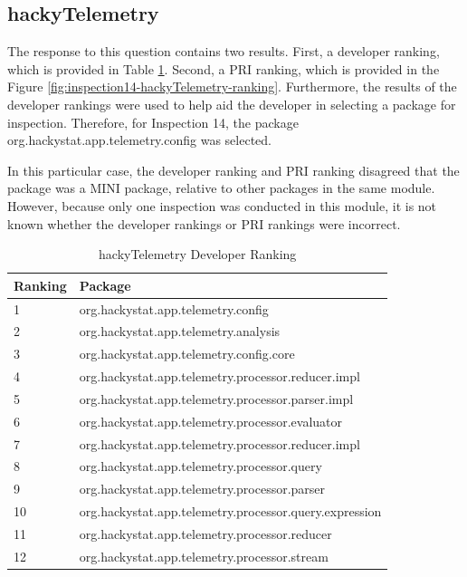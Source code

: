 \clearpage
\subsection{hackyTelemetry}
The response to this question contains two results. First, a developer
ranking, which is provided in Table
\ref{tab:hackyTelemetry-developer-ranking}. Second, a PRI ranking, which is
provided in the Figure \ref{fig:inspection14-hackyTelemetry-ranking}.
Furthermore, the results of the developer rankings were used to help aid
the developer in selecting a package for inspection. Therefore, for
Inspection 14, the package org.hackystat.app.telemetry.config was selected.

In this particular case, the developer ranking and PRI ranking disagreed
that the package was a MINI package, relative to other packages in the same
module. However, because only one inspection was conducted in this module,
it is not known whether the developer rankings or PRI rankings were
incorrect.

\begin{table}[!h]
  \begin{center}
    \caption{hackyTelemetry Developer Ranking}
    \label{tab:hackyTelemetry-developer-ranking}
    \begin{tabular}{|p{1.5cm}|p{11.5cm}|} \hline
{\bf Ranking} & {\bf Package} \\ \hline
1 & org.hackystat.app.telemetry.config \\ \hline
2 & org.hackystat.app.telemetry.analysis \\ \hline
3 & org.hackystat.app.telemetry.config.core \\ \hline
4 & org.hackystat.app.telemetry.processor.reducer.impl \\ \hline
5 & org.hackystat.app.telemetry.processor.parser.impl \\ \hline
6 & org.hackystat.app.telemetry.processor.evaluator \\ \hline
7 & org.hackystat.app.telemetry.processor.reducer.impl \\ \hline
8 & org.hackystat.app.telemetry.processor.query \\ \hline
9 & org.hackystat.app.telemetry.processor.parser \\ \hline
10 & org.hackystat.app.telemetry.processor.query.expression \\ \hline
11 & org.hackystat.app.telemetry.processor.reducer \\ \hline
12 & org.hackystat.app.telemetry.processor.stream \\ \hline
    \end{tabular}
  \end{center}
\end{table}



